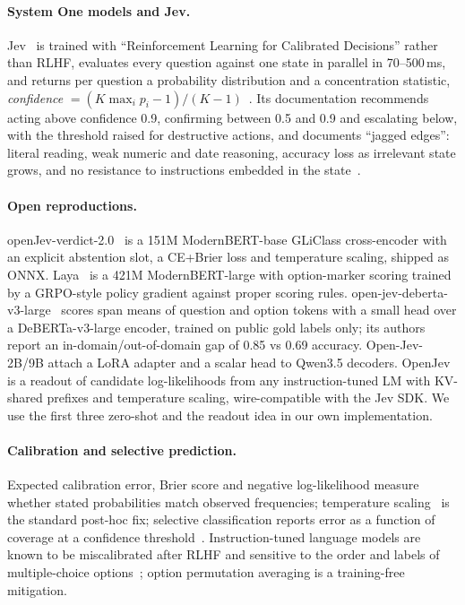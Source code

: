 \documentclass[11pt]{article}
\begin{document}
\paragraph{System One models and Jev.} Jev~\cite{jevblog} is trained with ``Reinforcement
Learning for Calibrated Decisions'' rather than RLHF, evaluates every question against one state
in parallel in 70--500\,ms, and returns per question a probability distribution and a
concentration statistic, \emph{confidence} $= (K\max_i p_i - 1)/(K-1)$~\cite{jevdocs}. Its
documentation recommends acting above confidence 0.9, confirming between 0.5 and 0.9 and
escalating below, with the threshold raised for destructive actions, and documents ``jagged
edges'': literal reading, weak numeric and date reasoning, accuracy loss as irrelevant state
grows, and no resistance to instructions embedded in the state~\cite{jevjagged}.

\paragraph{Open reproductions.} openJev-verdict-2.0~\cite{openjevverdict} is a 151M
ModernBERT-base GLiClass cross-encoder with an explicit abstention slot, a CE+Brier loss and
temperature scaling, shipped as ONNX. Laya~\cite{laya} is a 421M ModernBERT-large with
option-marker scoring trained by a GRPO-style policy gradient against proper scoring rules.
open-jev-deberta-v3-large~\cite{openjevdeberta} scores span means of question and option
tokens with a small head over a DeBERTa-v3-large encoder, trained on public gold labels only;
its authors report an in-domain/out-of-domain gap of 0.85 vs 0.69 accuracy. Open-Jev-2B/9B
\cite{openjev9b} attach a LoRA adapter and a scalar head to Qwen3.5 decoders. OpenJev
\cite{openjevreadout} is a readout of candidate log-likelihoods from any instruction-tuned LM
with KV-shared prefixes and temperature scaling, wire-compatible with the Jev SDK. We use the
first three zero-shot and the readout idea in our own implementation.

\paragraph{Calibration and selective prediction.} Expected calibration error, Brier score and
negative log-likelihood measure whether stated probabilities match observed frequencies;
temperature scaling~\cite{guo2017} is the standard post-hoc fix; selective classification
reports error as a function of coverage at a confidence threshold~\cite{geifman2017}.
Instruction-tuned language models are known to be miscalibrated after RLHF and sensitive to
the order and labels of multiple-choice options~\cite{zheng2023mcq,pezeshkpour2023}; option
permutation averaging is a training-free mitigation.
\end{document}
